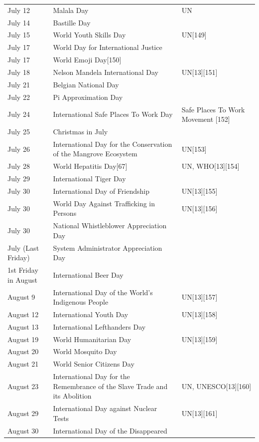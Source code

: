 \documentclass[
  openany]{book}
\begin{document}
\begin{longtable}[t]{>{\raggedright\arraybackslash}p{8em}>{\raggedright\arraybackslash}p{20em}>{\raggedright\arraybackslash}p{12em}}
July 12 & Malala Day & UN\\
July 14 & Bastille Day & \\
\addlinespace
July 15 & World Youth Skills Day & UN[149]\\
July 17 & World Day for International Justice & \\
July 17 & World Emoji Day[150] & \\
July 18 & Nelson Mandela International Day & UN[13][151]\\
July 21 & Belgian National Day & \\
\addlinespace
July 22 & Pi Approximation Day & \\
July 24 & International Safe Places To Work Day & Safe Places To Work Movement [152]\\
July 25 & Christmas in July & \\
July 26 & International Day for the Conservation of the Mangrove Ecosystem & UN[153]\\
July 28 & World Hepatitis Day[67] & UN, WHO[13][154]\\
\addlinespace
July 29 & International Tiger Day & \\
July 30 & International Day of Friendship & UN[13][155]\\
July 30 & World Day Against Trafficking in Persons & UN[13][156]\\
July 30 & National Whistleblower Appreciation Day & \\
July (Last Friday) & System Administrator Appreciation Day & \\
\addlinespace
1st Friday in August & International Beer Day & \\
August 9 & International Day of the World's Indigenous People & UN[13][157]\\
August 12 & International Youth Day & UN[13][158]\\
August 13 & International Lefthanders Day & \\
August 19 & World Humanitarian Day & UN[13][159]\\
\addlinespace
August 20 & World Mosquito Day & \\
August 21 & World Senior Citizens Day & \\
August 23 & International Day for the Remembrance of the Slave Trade and its Abolition & UN, UNESCO[13][160]\\
August 29 & International Day against Nuclear Tests & UN[13][161]\\
August 30 & International Day of the Disappeared & \\

\end{longtable}
\end{document}
